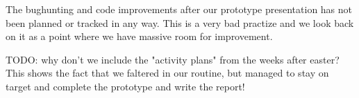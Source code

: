 The bughunting and code improvements after our prototype presentation has not been planned or tracked in any way. This is a very bad practize and we look back on it as a point where we have massive room for improvement.

TODO: why don't we include the "activity plans" from the weeks after easter? This shows the fact that we faltered in our routine, but managed to stay on target and complete the prototype and write the report!
